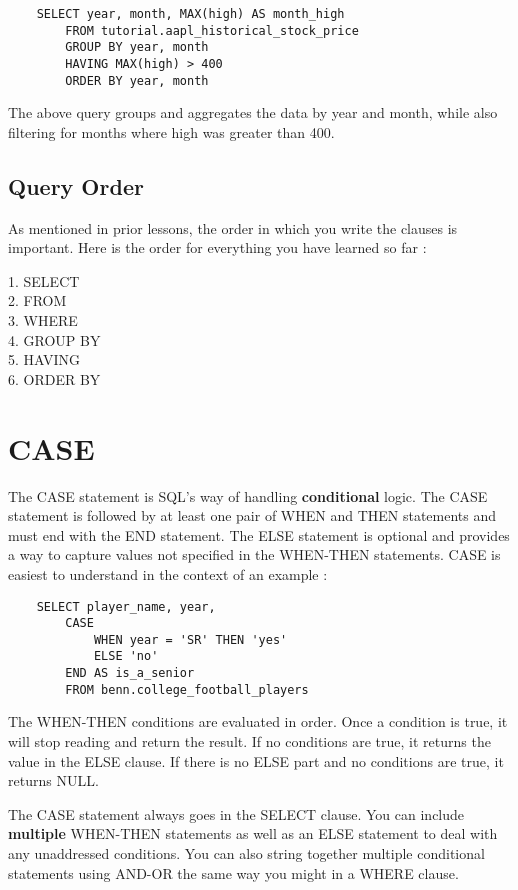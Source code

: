 \documentclass[12pt, letterpaper]{article}
\begin{document}
\begin{verbatim}
    SELECT year, month, MAX(high) AS month_high
        FROM tutorial.aapl_historical_stock_price
        GROUP BY year, month
        HAVING MAX(high) > 400
        ORDER BY year, month
\end{verbatim}

The above query groups and aggregates the data by year and month, while also filtering for months where high was greater than 400. 

\subsection{Query Order}
As mentioned in prior lessons, the order in which you write the clauses is important. Here is the order for everything you have learned so far : 

\begin{displayquote}
    1. SELECT \\
    2. FROM \\
    3. WHERE \\
    4. GROUP BY \\
    5. HAVING \\
    6. ORDER BY
\end{displayquote}


\section{CASE}
The CASE statement is SQL's way of handling \textbf{conditional} logic. The CASE statement is followed by at least one pair of WHEN and THEN statements and must end with the END statement. The ELSE statement is optional and provides a way to capture values not specified in the WHEN-THEN statements. CASE is easiest to understand in the context of an example : 

\begin{verbatim}
    SELECT player_name, year,
        CASE
            WHEN year = 'SR' THEN 'yes'
            ELSE 'no'
        END AS is_a_senior
        FROM benn.college_football_players
\end{verbatim}

The WHEN-THEN conditions are evaluated in order. Once a condition is true, it will stop reading and return the result. If no conditions are true, it returns the value in the ELSE clause. If there is no ELSE part and no conditions are true, it returns NULL.

The CASE statement always goes in the SELECT clause. You can include \textbf{multiple} WHEN-THEN statements as well as an ELSE statement to deal with any unaddressed conditions. You can also string together multiple conditional statements using AND-OR the same way you might in a WHERE clause.
\end{document}
